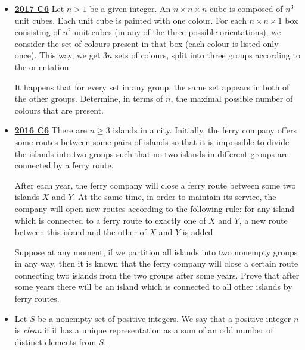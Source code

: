 \documentclass[11pt]{scrartcl}
\begin{document}
\begin{itemize}[leftmargin=*]
    \begin{enumerate}[(a)]
        \item If there is at least a pair of equal numbers on the board, we choose such a pair and increase one of its components by $a$ and the other by $b$.
        \item If no such pair exists, we write two times the number $0$.
    \end{enumerate}
Prove that, no matter how we make the choices in $(a)$, operation $(b)$ will be performed only finitely many times.
    \item \href{https://artofproblemsolving.com/community/c6h1671284p10632333}{\textbf{2017 C6}}  Let $n > 1$ be a given integer. An $n \times n \times n$ cube is composed of $n^3$ unit cubes. Each unit cube is painted with one colour. For each $n \times n \times 1$ box consisting of $n^2$ unit cubes (in any of the three possible orientations), we consider the set of colours present in that box (each colour is listed only once). This way, we get $3n$ sets of colours, split into three groups according to the orientation.

It happens that for every set in any group, the same set appears in both of the other groups. Determine, in terms of $n$, the maximal possible number of colours that are present.
\newpage

    \item \href{https://artofproblemsolving.com/community/c6h1480703p8639274}{\textbf{2016 C6}} There are $n \geqslant  3$ islands in a city. Initially, the ferry company offers some routes between some pairs of islands so that it is impossible to divide the islands into two groups such that no two islands in different groups are connected by a ferry route.

After each year, the ferry company will close a ferry route between some two islands $X$ and $Y$. At the same time, in order to maintain its service, the company will open new routes according to the following rule: for any island which is connected to a ferry route to exactly one of $X$ and $Y$, a new route between this island and the other of $X$ and $Y$ is added.

Suppose at any moment, if we partition all islands into two nonempty groups in any way, then it is known that the ferry company will close a certain route connecting two islands from the two groups after some years. Prove that after some years there will be an island which is connected to all other islands by ferry routes.
    \item {} 	Let $S$ be a nonempty set of positive integers. We say that a positive integer $n$ is \textit{clean} if it has a unique representation as a sum of an odd number of distinct elements from $S$. 
    

\end{itemize}
\end{document}
